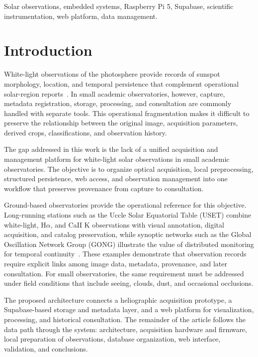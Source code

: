 \documentclass[conference,a4paper]{IEEEtran}
\begin{document}
\begin{IEEEkeywords}
Solar observations, embedded systems, Raspberry Pi 5, Supabase, scientific instrumentation, web platform, data management.
\end{IEEEkeywords}

\section{Introduction}

White-light observations of the photosphere provide records of sunspot morphology, location, and temporal persistence that complement operational solar-region reports~\cite{mcintosh1990classification,noaaSRS}. In small academic observatories, however, capture, metadata registration, storage, processing, and consultation are commonly handled with separate tools. This operational fragmentation makes it difficult to preserve the relationship between the original image, acquisition parameters, derived crops, classifications, and observation history.

The gap addressed in this work is the lack of a unified acquisition and management platform for white-light solar observations in small academic observatories. The objective is to organize optical acquisition, local preprocessing, structured persistence, web access, and observation management into one workflow that preserves provenance from capture to consultation.

Ground-based observatories provide the operational reference for this objective. Long-running stations such as the Uccle Solar Equatorial Table (USET) combine white-light, H$\alpha$, and CaII K observations with visual annotation, digital acquisition, and catalog preservation, while synoptic networks such as the Global Oscillation Network Group (GONG) illustrate the value of distributed monitoring for temporal continuity~\cite{robUSET2026,sidcGroundObservations2026,nsoGONG2026}. These examples demonstrate that observation records require explicit links among image data, metadata, provenance, and later consultation. For small observatories, the same requirement must be addressed under field conditions that include seeing, clouds, dust, and occasional occlusions.

The proposed architecture connects a heliographic acquisition prototype, a Supabase-based storage and metadata layer, and a web platform for visualization, processing, and historical consultation. The remainder of the article follows the data path through the system: architecture, acquisition hardware and firmware, local preparation of observations, database organization, web interface, validation, and conclusions.
\end{document}
